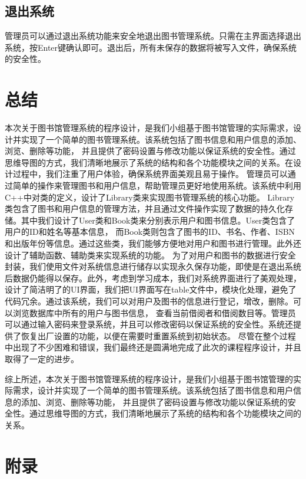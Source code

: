 \documentclass{article}
\begin{document}
\subsection{退出系统}
管理员可以通过退出系统功能来安全地退出图书管理系统。只需在主界面选择退出系统，按Enter键确认即可。退出后，所有未保存的数据将被写入文件，确保系统的安全性。

\section{总结}

本次关于图书馆管理系统的程序设计，是我们小组基于图书馆管理的实际需求，设计并实现了一个简单的图书管理系统。该系统包括了图书信息和用户信息的添加、浏览、删除等功能，
并且提供了密码设置与修改功能以保证系统的安全性。通过思维导图的方式，我们清晰地展示了系统的结构和各个功能模块之间的关系。在设计过程中，我们注重了用户体验，确保系统界面美观且易于操作。
管理员可以通过简单的操作来管理图书和用户信息，帮助管理员更好地使用系统。该系统中利用C++中对类的定义，设计了Library类来实现图书管理系统的核心功能。
Library类包含了图书和用户信息的管理方法，并且通过文件操作实现了数据的持久化存储。其中我们设计了User类和Book类来分别表示用户和图书信息。User类包含了用户的ID和姓名等基本信息，
而Book类则包含了图书的ID、书名、作者、ISBN和出版年份等信息。通过这些类，我们能够方便地对用户和图书进行管理。此外还设计了辅助函数、辅助类来实现系统的功能。
为了对用户和图书的数据进行安全封装，我们使用文件对系统信息进行储存以实现永久保存功能，即使是在退出系统后数据仍能得以保存。此外，考虑到学习成本，我们对系统界面进行了美观处理，
设计了简洁明了的UI界面，我们把UI界面写在table文件中，模块化处理，避免了代码冗余。通过该系统，我们可以对用户及图书的信息进行登记，增改，删除。可以浏览数据库中所有的用户与图书信息，
查看当前借阅者和借阅数目等。管理员可以通过输入密码来登录系统，并且可以修改密码以保证系统的安全性。系统还提供了恢复出厂设置的功能，以便在需要时重置系统到初始状态。
尽管在整个过程中出现了不少困难和错误，我们最终还是圆满地完成了此次的课程程序设计，并且取得了一定的进步。

综上所述，本次关于图书馆管理系统的程序设计，是我们小组基于图书馆管理的实际需求，设计并实现了一个简单的图书管理系统。该系统包括了图书信息和用户信息的添加、浏览、删除等功能，
并且提供了密码设置与修改功能以保证系统的安全性。通过思维导图的方式，我们清晰地展示了系统的结构和各个功能模块之间的关系。

\newpage
\section{附录}
\newpage
\end{document}

